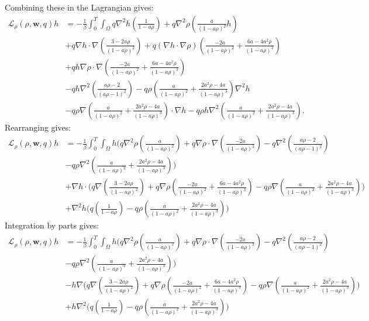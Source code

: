 \documentclass[11pt, a4paper]{article}
\theoremstyle{definition}
\newcommand{\w}{\mathbf{w}}
\begin{document}
Combining these in the Lagrangian gives:
\begin{align*}
	\mathcal{L}_\rho(\rho,\w,q)h &= -\frac{1}{\beta}\int_0^T \int_\Omega q \nabla^2 h \left(\frac{1}{1- a\rho} \right) + q\nabla^2 \rho \left(\frac{a}{(1- a\rho)^2}h\right)\\
	&+ q\nabla h \cdot \nabla \left( \frac{3-2a\rho}{(1-a\rho)^2} \right) + q\left(\nabla h \cdot \nabla \rho \right) \left( \frac{-2a }{(1-a\rho)^2} + \frac{6a-4a^2  \rho}{(1-a\rho)^3}  \right) \\
	&+ qh \nabla \rho \cdot \nabla \left(\frac{-2a }{(1-a\rho)^2} + \frac{6a-4a^2  \rho}{(1-a\rho)^3}  \right)\\
	&- qh \nabla^2 \left(\frac{a\rho -2}{(a\rho -1)^2}\right) - q\rho  \left(\frac{a }{(1-a\rho)^2} + \frac{2a^2\rho -4a}{(1-a\rho)^3} \right)\nabla^2 h \\
	&- q\rho \nabla \left(\frac{a }{(1-a\rho)^2} + \frac{2a^2\rho -4a}{(1-a\rho)^3} \right) \cdot \nabla h - q\rho h \nabla^2  \left(\frac{a }{(1-a\rho)^2} + \frac{2a^2\rho -4a}{(1-a\rho)^3} \right).
\end{align*}
Rearranging gives:
\begin{align*}
	\mathcal{L}_\rho(\rho,\w,q)h &= -\frac{1}{\beta}\int_0^T \int_\Omega h \bigg(q\nabla^2 \rho \left(\frac{a}{(1- a\rho)^2}\right)  + q \nabla \rho \cdot \nabla \left(\frac{-2a }{(1-a\rho)^2} \right) - q \nabla^2 \left(\frac{a\rho -2}{(a\rho -1)^2}\right)\\
	&- q\rho  \nabla^2  \left(\frac{a }{(1-a\rho)^2} + \frac{2a^2\rho -4a}{(1-a\rho)^3} \right)\bigg)\\
	&+ \nabla h \cdot \bigg( q  \nabla \left( \frac{3-2a\rho}{(1-a\rho)^2} \right) + q \nabla \rho  \left( \frac{-2a }{(1-a\rho)^2} + \frac{6a-4a^2  \rho}{(1-a\rho)^3}  \right)- q\rho \nabla \left(\frac{a }{(1-a\rho)^2} + \frac{2a^2\rho -4a}{(1-a\rho)^3} \right) \bigg)\\
	&+ \nabla^2 h \bigg(q \left(\frac{1}{1- a\rho} \right)  - q\rho  \left(\frac{a }{(1-a\rho)^2} + \frac{2a^2\rho -4a}{(1-a\rho)^3} \right)  \bigg)
\end{align*}
Integration by parts gives:
\begin{align*}
	\mathcal{L}_\rho(\rho,\w,q)h &= -\frac{1}{\beta}\int_0^T \int_\Omega h \bigg(q\nabla^2 \rho \left(\frac{a}{(1- a\rho)^2}\right)  + q \nabla \rho \cdot \nabla \left(\frac{-2a }{(1-a\rho)^2} \right) - q \nabla^2 \left(\frac{a\rho -2}{(a\rho -1)^2}\right)\\
	&- q\rho  \nabla^2  \left(\frac{a }{(1-a\rho)^2} + \frac{2a^2\rho -4a}{(1-a\rho)^3} \right)\bigg)\\
	&-  h \nabla \bigg( q  \nabla \left( \frac{3-2a\rho}{(1-a\rho)^2} \right) + q \nabla \rho  \left( \frac{-2a }{(1-a\rho)^2} + \frac{6a-4a^2  \rho}{(1-a\rho)^3}  \right)- q\rho \nabla \left(\frac{a }{(1-a\rho)^2} + \frac{2a^2\rho -4a}{(1-a\rho)^3} \right) \bigg)\\
	&+  h \nabla^2\bigg(q \left(\frac{1}{1- a\rho} \right)  - q\rho  \left(\frac{a }{(1-a\rho)^2} + \frac{2a^2\rho -4a}{(1-a\rho)^3} \right)  \bigg)
\end{align*}
\end{document}
